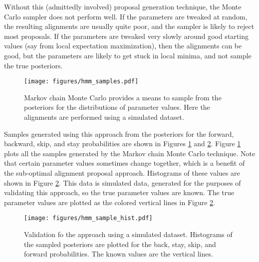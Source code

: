Without this (admittedly involved) proposal generation technique, the Monte Carlo sampler does not perform well.  If the parameters are tweaked at random, the resulting alignments are usually quite poor, and the sampler is likely to reject most proposals.  If the parameters are tweaked very slowly around good starting values (say from local expectation maximization), then the alignments can be good, but the parameters are likely to get stuck in local minima, and not sample the true posteriors.

\begin{figure}[h]
\begin{centering}
\texttt{[image: figures/hmm\_samples.pdf]}
\caption[Data analysis: parameter estimation MCMC sampling]{Markov chain Monte Carlo provides a means to sample from the posteriors for the distributions of parameter values.  Here the alignments are performed using a simulated dataset.}
\label{fig:data_analysis_hmm_samples}
\end{centering}
\end{figure}

Samples generated using this approach from the posteriors for the forward, backward, skip, and stay probabilities are shown in Figures \ref{fig:data_analysis_hmm_samples} and \ref{fig:data_analysis_hmm_sample_hist}.  Figure \ref{fig:data_analysis_hmm_samples} plots all the samples generated by the Markov chain Monte Carlo technique.  Note that certain parameter values sometimes change together, which is a benefit of the sub-optimal alignment proposal approach.  Histograms of these values are shown in Figure \ref{fig:data_analysis_hmm_sample_hist}.  This data is simulated data, generated for the purposes of validating this approach, so the true parameter values are known.  The true parameter values are plotted as the colored vertical lines in Figure \ref{fig:data_analysis_hmm_sample_hist}.

\begin{figure}[h]
\begin{centering}
\texttt{[image: figures/hmm\_sample\_hist.pdf]}
\caption[Data analysis: parameter estimation posteriors]{Validation fo the approach using a simulated dataset.  Histograms of the sampled posteriors are plotted for the back, stay, skip, and forward probabilities.  The known values are the vertical lines.}
\label{fig:data_analysis_hmm_sample_hist}
\end{centering}
\end{figure}
